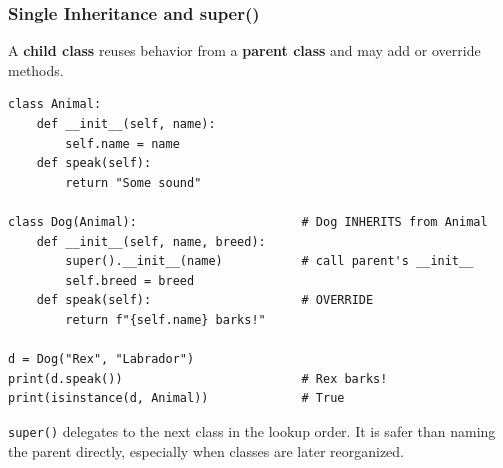 \documentclass[aspectratio=169,10pt]{beamer}
\newcommand{\keyword}[1]{\textcolor{PrimaryBlue}{\textbf{#1}}}
\newcommand{\codeword}[1]{\texttt{#1}}
\newenvironment{bluebox}[1]{%
  \vspace{0.08cm}\begin{tcolorbox}[lecturebox,title={#1},fontupper=\small]%
}{\end{tcolorbox}\vspace{0.05cm}}
\begin{document}
\begin{frame}[fragile]
\frametitle{Single Inheritance and super()}
\small
A \keyword{child class} reuses behavior from a \keyword{parent class} and may add or override methods.

\vspace{0.1cm}
\begin{lstlisting}[style=pycode]
class Animal:
    def __init__(self, name):
        self.name = name
    def speak(self):
        return "Some sound"

class Dog(Animal):                       # Dog INHERITS from Animal
    def __init__(self, name, breed):
        super().__init__(name)           # call parent's __init__
        self.breed = breed
    def speak(self):                     # OVERRIDE
        return f"{self.name} barks!"

d = Dog("Rex", "Labrador")
print(d.speak())                         # Rex barks!
print(isinstance(d, Animal))             # True
\end{lstlisting}

\begin{bluebox}{Why super()?}
\codeword{super()} delegates to the next class in the lookup order. It is safer than naming the parent directly, especially when classes are later reorganized.
\end{bluebox}
\end{frame}
\end{document}
